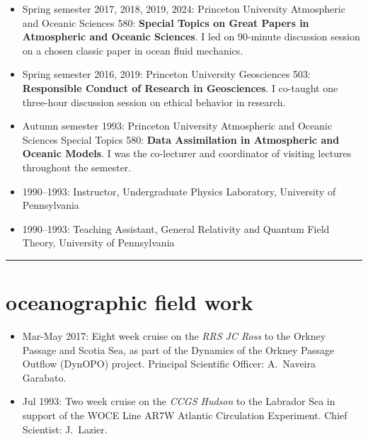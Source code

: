 \documentclass{article}
\begin{document}
\begin{itemize}[leftmargin=*]
\item Spring semester 2017, 2018, 2019, 2024: Princeton University Atmospheric and Oceanic Sciences 580: {\bf Special Topics on Great Papers in Atmospheric and Oceanic Sciences}. I led on 90-minute discussion session on a chosen classic paper in ocean fluid mechanics. 

\item Spring semester 2016, 2019: Princeton University Geosciences 503: {\bf Responsible Conduct of Research in Geosciences}.  I co-taught one three-hour discussion session on ethical behavior in research. 

\item Autumn semester 1993: Princeton University Atmospheric and Oceanic Sciences Special Topics 580: {\bf Data Assimilation in Atmospheric and Oceanic Models}. I was the co-lecturer and coordinator of visiting lectures throughout the semester. 

\item 1990--1993:  Instructor, Undergraduate Physics Laboratory, University of Pennsylvania 

\item 1990--1993:  Teaching Assistant,  General Relativity and Quantum Field Theory, University of Pennsylvania 

\end{itemize}

\noindent\rule{\textwidth}{1pt}
\vspace{-1cm}
\section*{\sc \color{Maroon}  oceanographic field work}
\vspace{-.25cm}

\begin{itemize}[leftmargin=*]
 \item 
 Mar-May 2017: Eight week cruise on the {\it RRS JC Ross}  to the Orkney Passage and Scotia Sea,
  as part of the
  Dynamics of the Orkney Passage Outflow (DynOPO) project. Principal Scientific Officer: A.\ Naveira Garabato. 
 \item 
  Jul 1993: Two week cruise on the {\it CCGS Hudson} to the Labrador Sea in support of  the WOCE Line AR7W Atlantic Circulation Experiment. Chief Scientist: J.\ Lazier.
\end{itemize}
\end{document}
